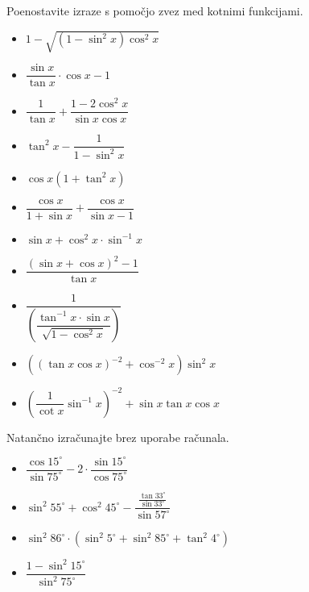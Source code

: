         
            \begin{naloga}
                Poenostavite izraze s pomočjo zvez med kotnimi funkcijami.
                \begin{multicols}{2}
                \begin{itemize}
                            \item $\displaystyle 1-\sqrt{\left(1-\sin^2x\right)\cos^2x} $ 
                            \item $\displaystyle \dfrac{\sin{x}}{\tan{x}}\cdot\cos{x}-1 $ 
                            \item $\displaystyle \dfrac{1}{\tan{x}}+\dfrac{1-2\cos^2{x}}{\sin{x}\cos{x}} $ 
                            \item $\displaystyle \tan^2{x}-\dfrac{1}{1-\sin^2{x}} $ 
                            \item $\displaystyle \cos{x}\left(1+\tan^2{x}\right) $ 
                            \item $\displaystyle \dfrac{\cos{x}}{1+\sin{x}}+\dfrac{\cos{x}}{\sin{x}-1} $ 
                            \item $\displaystyle \sin{x}+\cos^2{x}\cdot\sin^{-1}{x} $ 
                            \item $\displaystyle \dfrac{\left(\sin{x}+\cos{x}\right)^2-1}{\tan{x}} $ 
                            \item $\displaystyle \dfrac{1}{\left(\dfrac{\tan^{-1}{x}\cdot\sin{x}}{\sqrt{1-\cos^2{x}}}\right)} $ 
                            \item $\displaystyle \left(\left(\tan{x}\cos{x}\right)^{-2}+\cos^{-2}{x}\right)\sin^2{x} $ 
                            \item $\displaystyle \left(\dfrac{1}{\cot{x}}\sin^{-1}{x}\right)^{-2}+\sin{x}\tan{x}\cos{x} $ 
                \end{itemize}
                \end{multicols}           
            \end{naloga}

        


        
            \begin{naloga}
                Natančno izračunajte brez uporabe računala.
                \begin{multicols}{2}
                \begin{itemize}
                    \item $\displaystyle \dfrac{\cos{15^\circ}}{\sin{75^\circ}}-2\cdot\dfrac{\sin{15^\circ}}{\cos{75^\circ}}$ 
                    \item $\displaystyle \sin^2{55^\circ}+\cos^2{45^\circ}-\dfrac{\frac{\tan{33^\circ}}{\sin{33^\circ}}}{\sin{57^\circ}}$ 
                    \item $\displaystyle \sin^2{86^\circ}\cdot\left(\sin^2{5^\circ}+\sin^2{85^\circ}+\tan^2{4^\circ}\right)$ 
                    \item $\displaystyle \dfrac{1-\sin^2{15^\circ}}{\sin^2{75^\circ}}$ 
                \end{itemize}
                \end{multicols}           
            \end{naloga}


